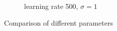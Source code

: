 \documentclass[a4paper,12pt]{article}
\begin{document}
\begin{figure}[h!]
\begin{center}
\begin{subfigure}{.33\textwidth}
      \caption{learning rate 500, $ \sigma = 1 $}
\end{subfigure}%
\end{center}
      \caption{Comparison of different parameters}
      \end{figure}
      
      
 
\end{document}
